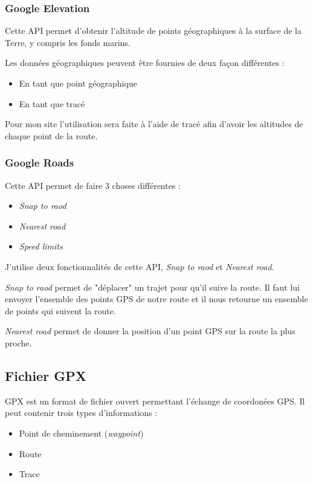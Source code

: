 \documentclass[a4paper]{article}
\begin{document}
\subsubsection{Google Elevation}
Cette API permet d'obtenir l'altitude de points géographiques à la surface de la Terre, y compris les fonds marins.

Les données géographiques peuvent être fournies de deux façon différentes : 
\begin{itemize}
	\item En tant que point géographique
	\item En tant que tracé
\end{itemize}

Pour mon site l'utilisation sera faite à l'aide de tracé afin d'avoir les altitudes de chaque point de la route.


\subsubsection{Google Roads}
Cette API permet de faire 3 choses différentes :
\begin{itemize}
    \item \emph{Snap to raod}
    \item \emph{Nearest road}
    \item \emph{Speed limits}
\end{itemize}

J'utilise deux fonctionnalités de cette API, \emph{Snap to raod} et \emph{Nearest road}.

\emph{Snap to raod} permet de "déplacer" un trajet pour qu'il suive la route. Il faut lui envoyer l'ensemble des points GPS de notre route et il nous retourne un ensemble de points qui suivent la route.

\emph{Nearest road} permet de donner la position d'un point GPS sur la route la plus proche.

\subsection{Fichier GPX}
GPX est un format de fichier ouvert permettant l'échange de coordonées GPS. Il peut contenir trois types d'informations : 

\begin{itemize}
	\item Point de cheminement (\emph{waypoint})
	\item Route
	\item Trace
\end{itemize}
\end{document}
